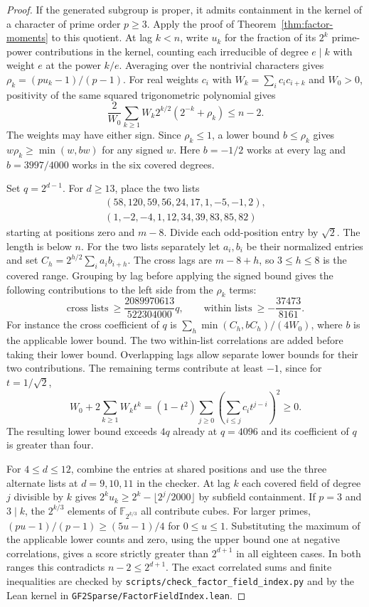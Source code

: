 \documentclass[11pt]{article}
\begin{document}
\begin{proof}
If the generated subgroup is proper, it admits containment in the
kernel of a character of prime order \(p\ge3\).
Apply the proof of Theorem~\ref{thm:factor-moments} to this quotient.
At lag \(k<n\), write \(u_k\) for the fraction of its \(2^k\) prime-power
contributions in the kernel, counting each irreducible of degree
\(e\mid k\) with weight \(e\) at the power \(k/e\).
Averaging over the nontrivial characters gives
\(\rho_k=(pu_k-1)/(p-1)\). For real weights \(c_i\) with
\(W_k=\sum_i c_ic_{i+k}\) and \(W_0>0\), positivity of the same squared
trigonometric polynomial gives
\[
 \frac{2}{W_0}\sum_{k\ge1}W_k2^{k/2}(2^{-k}+\rho_k)\le n-2 .
\]
The weights may have either sign. Since \(\rho_k\le1\), a lower bound
\(b\le\rho_k\) gives \(w\rho_k\ge\min(w,bw)\) for any signed \(w\).
Here \(b=-1/2\) works at every lag and \(b=3997/4000\) works in the
six covered degrees.

Set \(q=2^{d-1}\). For \(d\ge13\), place the two lists
\[
 \begin{split}
 (58,120,59,56,24,17,1,-5,-1,2),\\
 (1,-2,-4,1,12,34,39,83,85,82)
 \end{split}
\]
starting at positions zero and \(m-8\). Divide each odd-position entry
by \(\sqrt2\). The length is below \(n\).
For the two lists separately let \(a_i,b_i\) be their normalized entries
and set \(C_h=2^{h/2}\sum_i a_i b_{i+h}\). The cross lags are \(m-8+h\),
so \(3\le h\le8\) is the covered range. Grouping by lag before applying
the signed bound gives the following contributions to the left side
from the \(\rho_k\) terms:
\[
 \text{cross lists}\ \ge \frac{2089970613}{522304000}q,\qquad
 \text{within lists}\ \ge -\frac{37473}{8161}.
\]
For instance the cross coefficient of \(q\) is
\(\sum_h\min(C_h,bC_h)/(4W_0)\), where \(b\) is the applicable lower bound.
The two within-list correlations are added before taking their lower bound.
Overlapping lags allow separate lower bounds for their two contributions.
The remaining terms contribute at least \(-1\), since for \(t=1/\sqrt2\),
\[
 W_0+2\sum_{k\ge1}W_k t^k
  =(1-t^2)\sum_{j\ge0}\left(\sum_{i\le j}c_i t^{j-i}\right)^2\ge0 .
\]
The resulting lower bound exceeds \(4q\) already at \(q=4096\) and
its coefficient of \(q\) is greater than four.

For \(4\le d\le12\), combine the entries at shared positions and use
the three alternate lists at \(d=9,10,11\) in the checker. At lag \(k\)
each covered field of degree \(j\) divisible by \(k\) gives
\(2^ku_k\ge2^k-\lfloor2^j/2000\rfloor\) by subfield containment.
If \(p=3\) and \(3\mid k\), the \(2^{k/3}\) elements of
\(\mathbb F_{2^{k/3}}\) all contribute cubes. For larger primes,
\((pu-1)/(p-1)\ge(5u-1)/4\) for \(0\le u\le1\).
Substituting the maximum of the applicable lower counts and zero,
using the upper bound one at negative correlations, gives a score
strictly greater than \(2^{d+1}\) in all eighteen cases. In both
ranges this contradicts \(n-2\le 2^{d+1}\).
The exact correlated sums and finite inequalities are checked by
\nolinkurl{scripts/check_factor_field_index.py} and by the Lean kernel in
\nolinkurl{GF2Sparse/FactorFieldIndex.lean}.
\end{proof}
\end{document}
